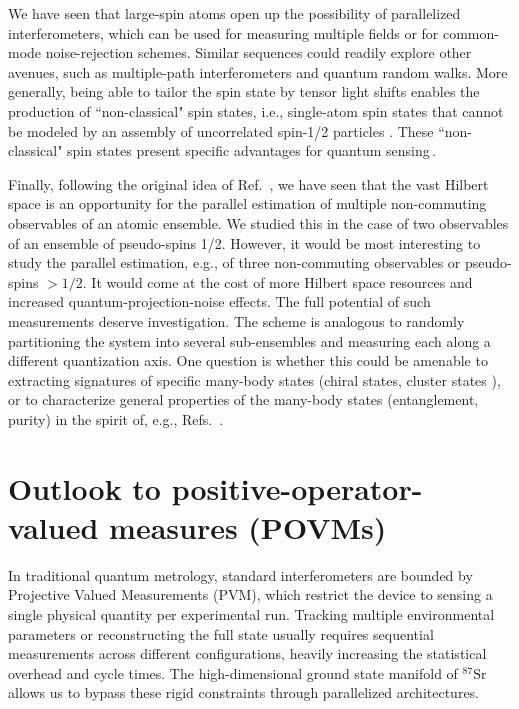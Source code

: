 We have seen that large-spin atoms open up the possibility of parallelized interferometers, which can be used for measuring multiple fields or for common-mode noise-rejection schemes. Similar sequences could readily explore other avenues, such as multiple-path interferometers and quantum random walks. More generally, being able to tailor the spin state by tensor light shifts enables the production of ``non-classical" spin states, i.e., single-atom spin states that cannot be modeled by an assembly of uncorrelated spin-1/2 particles \cite{Satoor2021}. These ``non-classical" spin states present specific advantages for quantum sensing\,\cite{Chalopin2018qes}. 
 
Finally, following the original idea of Ref.~\cite{Kunkel2019}, we have seen that the vast Hilbert space is an opportunity for the parallel estimation of multiple non-commuting observables of an atomic ensemble. We studied this in the case of two observables of an ensemble of pseudo-spins 1/2. However, it would be most interesting to study the parallel estimation, e.g., of three non-commuting observables or pseudo-spins $>1/2$. It would come at the cost of more Hilbert space resources and increased quantum-projection-noise effects. 
The full potential of such measurements deserve investigation. The scheme is analogous to randomly partitioning the system into several sub-ensembles and measuring each along a different quantization axis. 
One question is whether this could be amenable to extracting signatures of specific many-body states (chiral states, cluster states \cite{Bornet2024, Mamaev2019}), or to characterize general properties of the many-body states (entanglement, purity) in the spirit of, e.g., Refs.~\cite{Brydges2019, Frerot2021}.

\section{Outlook to positive-operator-valued measures (POVMs)}
\label{sec:povm_framework_and_derivation}

In traditional quantum metrology, standard interferometers are bounded by Projective Valued Measurements (PVM), which restrict the device to sensing a single physical quantity per experimental run. Tracking multiple environmental parameters or reconstructing the full state usually requires sequential measurements across different configurations, heavily increasing the statistical overhead and cycle times. The high-dimensional ground state manifold of $^{87}\text{Sr}$ allows us to bypass these rigid constraints through parallelized architectures. 

